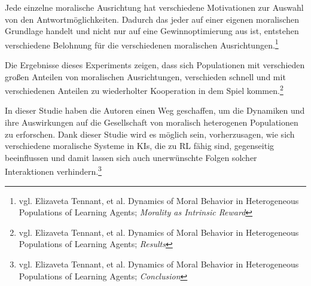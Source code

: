 Jede einzelne moralische Ausrichtung hat verschiedene Motivationen zur Auswahl von den Antwortmöglichkeiten.
Dadurch das jeder auf einer eigenen moralischen Grundlage handelt und nicht nur auf eine Gewinnoptimierung aus ist,
entstehen verschiedene Belohnung für die verschiedenen moralischen Ausrichtungen.\footnote{vgl. Elizaveta Tennant, et al. Dynamics of Moral Behavior in Heterogeneous Populations of Learning Agents; \textit{Morality as Intrinsic Reward}}

Die Ergebnisse dieses Experiments zeigen, dass sich Populationen mit verschieden großen Anteilen von moralischen Ausrichtungen,
verschieden schnell und mit verschiedenen Anteilen zu wiederholter Kooperation in dem Spiel kommen.\footnote{vgl. Elizaveta Tennant, et al. Dynamics of Moral Behavior in Heterogeneous Populations of Learning Agents; \textit{Results}}

In dieser Studie haben die Autoren einen Weg geschaffen, um die Dynamiken und ihre Auswirkungen auf die Gesellschaft von moralisch heterogenen Populationen
zu erforschen.
Dank dieser Studie wird es möglich sein, vorherzusagen, wie sich verschiedene moralische Systeme in KIs, die zu RL fähig sind, gegenseitig
beeinflussen und damit lassen sich auch unerwünschte Folgen solcher Interaktionen verhindern.\footnote{vgl. Elizaveta Tennant, et al. Dynamics of Moral Behavior in Heterogeneous Populations of Learning Agents; \textit{Conclusion}}

